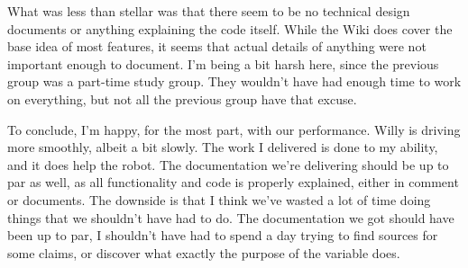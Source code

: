 What was less than stellar was that there seem to be no technical design documents or anything explaining the code itself.
While the Wiki does cover the base idea of most features, it seems that actual details of anything were not important enough to document.
I'm being a bit harsh here, since the previous group was a part-time study group.
They wouldn't have had enough time to work on everything, but not all the previous group have that excuse.

To conclude, I'm happy, for the most part, with our performance.
Willy is driving more smoothly, albeit a bit slowly.
The work I delivered is done to my ability, and it does help the robot.
The documentation we're delivering should be up to par as well, as all functionality and code is properly explained, either in comment or documents.
The downside is that I think we've wasted a lot of time doing things that we shouldn't have had to do.
The documentation we got should have been up to par, I shouldn't have had to spend a day trying to find sources for some claims, or discover what exactly the purpose of the variable  does.



\newpage